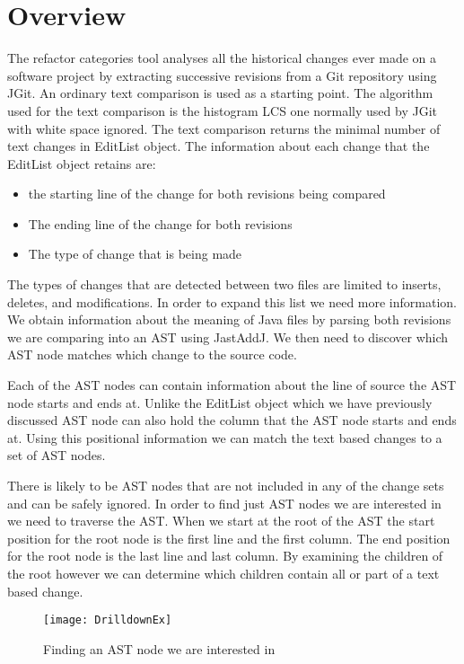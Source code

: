 \section{Overview}
The refactor categories tool analyses all the historical changes ever made on a software project by extracting successive revisions from a Git repository using JGit.
An ordinary text comparison is used as a starting point.  The algorithm used for the text comparison is the histogram LCS one normally used by JGit with white space ignored. The text comparison returns the minimal number of text changes in EditList object.  The information about each change that the EditList object retains are:

\begin{itemize}
  \item the starting line of the change for both revisions being compared
  \item The ending line of the change for both revisions 
  \item The type of change that is being made
\end{itemize}

The types of changes that are detected between two files are limited to inserts, deletes, and modifications. In order to expand this list we need more information.  We obtain information about the meaning of Java files by parsing both revisions we are comparing into an AST using JastAddJ. We then need to discover which AST node matches which change to the source code. 

Each of the AST nodes can contain information about the line of source the AST node starts and ends at.  Unlike the EditList object which we have previously discussed AST node can also hold the column that the AST node starts and ends at.  Using this positional information we can match the text based changes to a set of AST nodes.

There is likely to be AST nodes that are not included in any of the change sets and can be safely ignored. In order to find just AST nodes we are interested in we need to traverse the AST.  When we start at the root of the AST the start position for the root node is the first line and the first column. The end position for the root node is the last line and last column.  By examining the children of the root however we can determine which children contain all or part of a text based change.

\begin{figure}[h]
 \begin{center}
  \texttt{[image: DrilldownEx]}
 \end{center}
 \caption{Finding an AST node we are interested in}
 \label{fig:findingASTNode}
\end{figure}  

